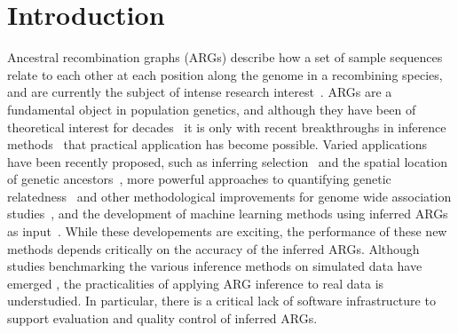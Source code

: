 \documentclass[unnumsec,webpdf,contemporary,large,namedate]{oup-authoring-template}%
\begin{document}
 \maketitle 

\section{Introduction}
Ancestral recombination graphs (ARGs) describe how a set of sample
sequences relate to each other at each position along the genome in a
recombining
species, and are currently the subject of intense research
interest~\citep{brandt2024promise,lewanski2024era,nielsen2024inference,
    wong2024general}. ARGs are a fundamental object in population genetics,
and although they have been of theoretical interest for
decades~\citep{Hudson1983,Griffiths1997} it is only with recent breakthroughs
in inference methods~\citep{rasmussen2014genome,
    speidel2019method,kelleher2019inferring,wohns2022unified,zhang2023biobank,
    gunnarsson2024scalable,deng2024robust} that practical application has
become possible. Varied applications have been recently proposed,
such as inferring selection~\citep{stern2019approximate,hejase2022deep} and
the spatial location of genetic ancestors~\citep{osmond2024estimating,deraje2024inferring,grundler2024geographic},
more powerful approaches to quantifying genetic
relatedness~\citep{fan2022genealogical,zhang2023biobank,gunnarsson2024scalable,lehmann2025on}
and other methodological improvements for genome wide association
studies~\citep{nowbandegani2023extremely,link2023tree},
and the development of machine learning methods using inferred
ARGs as input~\citep{hejase2022deep,pearson2023local,korfmann2024simultaneous,
whitehouse2024tree}.
While these developements are exciting, the performance 
of these new methods depends critically on the accuracy of the inferred ARGs.
Although studies benchmarking the various inference methods on 
simulated data have emerged 
\citep{brandt2022evaluation,deng2024robust,peng2024evaluating},
the practicalities of applying ARG inference to real data is 
understudied. In particular, there is a critical lack of software 
infrastructure to support evaluation and quality control of 
inferred ARGs.
\end{document}
